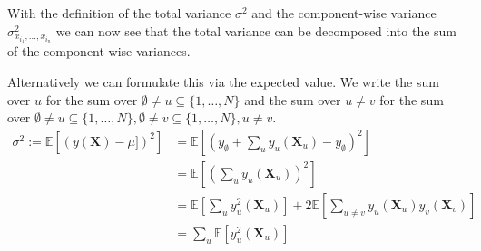 With the definition of the total variance $\sigma^2$ and the component-wise variance $\sigma^2_{x_{i_1}, \dots, x_{i_n}}$ we can now see that the total variance can be decomposed into the sum of the component-wise variances.

Alternatively we can formulate this via the expected value. We write the sum over $u$ for the sum over $\emptyset \neq u \subseteq \{1, \dots, N\}$ and the sum over $u \neq v$ for the sum over $\emptyset \neq u \subseteq \{1, \dots, N\}, \emptyset \neq v \subseteq \{1, \dots, N\}, u \neq v$.
\begin{align*}
    \sigma^2 := \mathbb{E}[(y(\boldsymbol{X}) - \mu])^2]
    &= \mathbb{E}[(y_{\emptyset} + \sum_{u} y_u({\boldsymbol{X}_u}) - y_{\emptyset})^2] \\
    &= \mathbb{E}[(\sum_{u} y_u({\boldsymbol{X}_u}))^2] \\
    &= \mathbb{E}[\sum_{u} y_u^2({\boldsymbol{X}_u})] + 2 \mathbb{E}[\sum_{u \neq v} y_u({\boldsymbol{X}_u})  y_v({\boldsymbol{X}_v})] \\
    & = \sum_{u} \mathbb{E}[y_u^2({\boldsymbol{X}_u})]
\end{align*}










